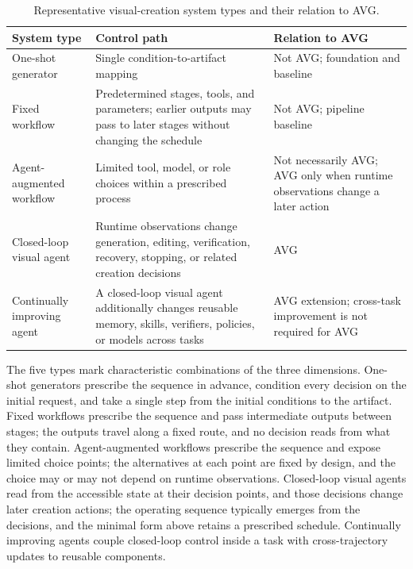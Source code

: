 \begin{table}[t]
  \caption{Representative visual-creation system types and their relation to AVG.}
  \label{tab:boundary}
  \small
  \begin{tabularx}{\columnwidth}{@{}p{}Xp{}@{}}
    \toprule
    System type & Control path & Relation to AVG \\
    \midrule
    One-shot generator & Single condition-to-artifact mapping & Not AVG; foundation and baseline \\
    Fixed workflow & Predetermined stages, tools, and parameters; earlier outputs may pass to later stages without changing the schedule & Not AVG; pipeline baseline \\
    Agent-augmented workflow & Limited tool, model, or role choices within a prescribed process & Not necessarily AVG; AVG only when runtime observations change a later action \\
    Closed-loop visual agent & Runtime observations change generation, editing, verification, recovery, stopping, or related creation decisions & AVG \\
    Continually improving agent & A closed-loop visual agent additionally changes reusable memory, skills, verifiers, policies, or models across tasks & AVG extension; cross-task improvement is not required for AVG \\
    \bottomrule
  \end{tabularx}
\end{table}

The five types mark characteristic combinations of the three dimensions. One-shot generators prescribe the sequence in advance, condition every decision on the initial request, and take a single step from the initial conditions to the artifact. Fixed workflows prescribe the sequence and pass intermediate outputs between stages; the outputs travel along a fixed route, and no decision reads from what they contain. Agent-augmented workflows prescribe the sequence and expose limited choice points; the alternatives at each point are fixed by design, and the choice may or may not depend on runtime observations. Closed-loop visual agents read from the accessible state at their decision points, and those decisions change later creation actions; the operating sequence typically emerges from the decisions, and the minimal form above retains a prescribed schedule. Continually improving agents couple closed-loop control inside a task with cross-trajectory updates to reusable components.

